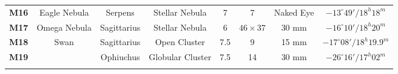 \documentclass[a4paper,12pt]{extarticle}
\begin{document}
\begin{table}[H]
\begin{tabular}{cccccccc}
\rowcolor[HTML]{D9D2E9} 
\textbf{M16}                             & Eagle Nebula                                                      & Serpens                                       & Stellar Nebula                         & 7                                                                                             & 7                                                                                               & Naked Eye                                                                                   & $-13^\circ 49'/ 18^h 18^m$                                                                   \\
\rowcolor[HTML]{D9D2E9} 
\textbf{M17}                             & Omega Nebula                                                      & Sagittarius                                   & Stellar Nebula                         & 6                                                                                             & $46\times37$                                                                                    & 30 mm                                                                                       & $-16^\circ 10'/ 18^h 20^m$                                                                   \\
\rowcolor[HTML]{D9EAD3} 
\textbf{M18}                             & Swan                                                              & Sagittarius                                   & Open Cluster                           & 7.5                                                                                          & 9                                                                                               & 15 mm                                                                                       & $-17^\circ 08'/ 18^h 19.9^m$                                                                 \\
\rowcolor[HTML]{FFF2CC} 
\textbf{M19}                             & \multicolumn{1}{l}{\cellcolor[HTML]{FFF2CC}}                      & Ophiuchus                                     & Globular Cluster                       & 7.5                                                                                           & 14                                                                                              & 30 mm                                                                                       & $-26^\circ 16'/ 17^h 02^m$                                                                   \\
\rowcolor[HTML]{E6B8AF} 

\end{tabular}
\end{table}
\end{document}
